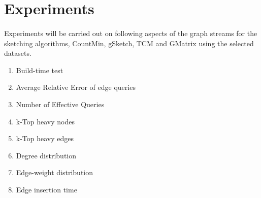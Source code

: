 \section{Experiments}
\label{section:design_experiments}

\paragraph{}
Experiments will be carried out on following aspects of the graph streams for the sketching algorithms, CountMin, gSketch, TCM and GMatrix using the selected datasets.

\begin{enumerate}
    \item Build-time test
    \item Average Relative Error of edge queries
    \item Number of Effective Queries
    \item k-Top heavy nodes
    \item k-Top heavy edges
    \item Degree distribution
    \item Edge-weight distribution
    \item Edge insertion time
\end{enumerate}